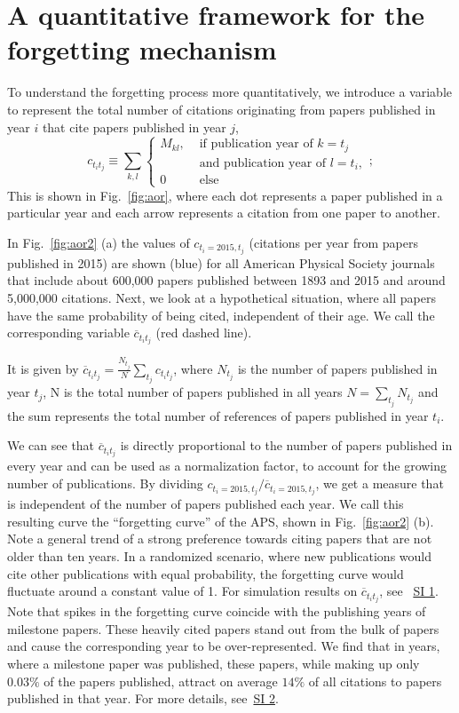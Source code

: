 \documentclass[draft,final]{vutinfth} %
\begin{document}
\section{A quantitative framework for the forgetting mechanism}

To understand the forgetting process more quantitatively, we introduce a variable to represent the total number of citations originating from papers published in year $i$ that cite papers published in year $j$,
\begin{equation}
c_{t_i t_j} \equiv \sum_{k,l} 
\begin{cases}
M_{kl}, & \text{ if publication year of $k$} = t_j \\
& \text{ and publication year of $l$} = t_i,\\
0 & \text{ else}
\end{cases};
\end{equation}
This is shown in Fig.~\ref{fig:aor}, where each dot represents a paper published in a particular year and each arrow represents a citation from one paper to another.


In Fig.~\ref{fig:aor2} (a) the values of $c_{t_i=2015,t_j}$ (citations per year from papers published in 2015) are shown (blue) for all American Physical Society journals that include about 600,000 papers published between 1893 and 2015 and around 5,000,000 citations. Next, we look at a hypothetical situation, where all papers have the same probability of being cited, independent of their age.
We call the corresponding variable $\overline{c}_{t_it_j}$ (red dashed line).

It is given by $\overline{c}_{t_it_j} = \frac{N_{t_j}}{N}\sum_{t_j} {c}_{t_it_j} $, where $N_{t_j}$ is the number of papers published in year $t_j$, N is the total number of papers published in all years $N=\sum_{t_j}N_{t_j} $ and the sum represents the total number of references of papers published in year $t_i$.

We can see that $\overline{c}_{t_it_j}$ is directly proportional to the number of papers published in every year and can be used as a normalization factor, to account for the growing number of publications. By dividing $c_{t_i=2015,t_j} / \overline{c}_{t_i=2015,t_j}$, we get a measure that is independent of the number of papers published each year.  We call this resulting curve the ``forgetting curve'' of the APS, shown in Fig.~\ref{fig:aor2} (b). Note a general trend of a strong preference towards citing papers that are not older than ten years. In a randomized scenario, where new publications would cite other publications with equal probability, the forgetting curve would fluctuate around a constant value of 1. For simulation results on $\overline{c}_{t_it_j}$, see ~\hyperref[SI1]{SI 1}.
Note that spikes in the forgetting curve coincide with the publishing years of milestone papers. These heavily cited papers stand out from the bulk of papers and cause the corresponding year to be over-represented. We find that in years, where a milestone paper was published, these papers, while making up only $0.03\%$ of the papers published, attract on average $14\%$ of all citations to papers published in that year. For more details, see~\hyperref[SIM2]{SI 2}.
\end{document}
